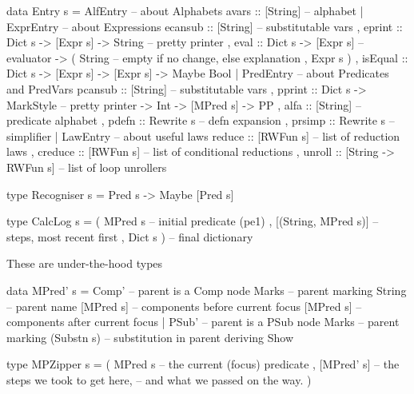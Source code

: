 \begin{code}
data Entry s =
   AlfEntry {   -- about Alphabets
    avars   :: [String]  -- alphabet
   }
 | ExprEntry { -- about Expressions
     ecansub :: [String]                   -- substitutable vars
   , eprint  :: Dict s -> [Expr s] -> String   -- pretty printer
   , eval    :: Dict s -> [Expr s]                  -- evaluator
             -> ( String -- empty if no change, else explanation
                , Expr s )
   , isEqual :: Dict s -> [Expr s] -> [Expr s] -> Maybe Bool
   }
 | PredEntry {    -- about Predicates and PredVars
     pcansub :: [String]                      -- substitutable vars
   , pprint  :: Dict s -> MarkStyle           -- pretty printer
             -> Int -> [MPred s]
             -> PP
   , alfa :: [String]  -- predicate alphabet
   , pdefn   :: Rewrite s                    -- defn expansion
   , prsimp  :: Rewrite s                    -- simplifier
   }
 | LawEntry {  -- about useful laws
     reduce  :: [RWFun s]              -- list of reduction laws
   , creduce :: [RWFun s]      -- list of conditional reductions
   , unroll  :: [String -> RWFun s]    -- list of loop unrollers
   }
\end{code}

\begin{code}
type Recogniser s = Pred s -> Maybe [Pred s]
\end{code}

\begin{code}
type CalcLog s = ( MPred s      -- initial predicate (pe1)
                 , [(String, MPred s)] -- steps, most recent first
                 , Dict s )     -- final dictionary
\end{code}


\newpage

These are under-the-hood types
\begin{code}
data MPred' s
 = Comp'         -- parent is a Comp node
     Marks       -- parent marking
     String      -- parent name
     [MPred s] -- components before current focus
     [MPred s] -- components after current focus
 | PSub'         -- parent is a PSub node
     Marks       -- parent marking
     (Substn s)  -- substitution in parent
 deriving Show
\end{code}

\begin{code}
type MPZipper s
  = ( MPred s    -- the current (focus) predicate
    , [MPred' s] -- the steps we took to get here,
                   -- and what we passed on the way.
    )
\end{code}

